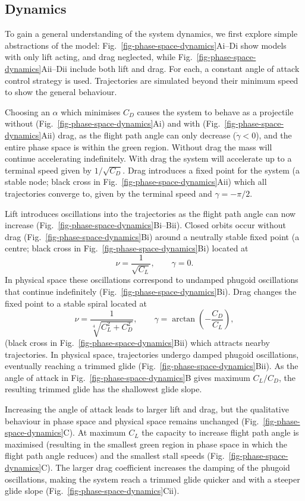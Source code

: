 \subsection{Dynamics} \label{sec-results-dynamics}

To gain a general understanding of the system dynamics, we first explore simple abstractions of the model: Fig.~\ref{fig-phase-space-dynamics}Ai--Di show models with only lift acting, and drag neglected, while Fig.~\ref{fig-phase-space-dynamics}Aii--Dii include both lift and drag. For each, a constant angle of attack control strategy is used. Trajectories are simulated beyond their minimum speed to show the general behaviour.

Choosing an $\alpha$ which minimises $C_D$ causes the system to behave as a projectile without (Fig.~\ref{fig-phase-space-dynamics}Ai) and with (Fig.~\ref{fig-phase-space-dynamics}Aii) drag, as the flight path angle can only decrease ($\dot{\gamma}<0$), and the entire phase space is within the green region. Without drag the mass will continue accelerating indefinitely. With drag the system will accelerate up to a terminal speed given by $1/\sqrt{C_D}$. Drag introduces a fixed point for the system (a stable node; black cross in Fig.~\ref{fig-phase-space-dynamics}Aii) which all trajectories converge to, given by the terminal speed and $\gamma=-\pi/2$.

Lift introduces oscillations into the trajectories as the flight path angle can now increase (Fig.~\ref{fig-phase-space-dynamics}Bi--Bii). Closed orbits occur without drag (Fig.~\ref{fig-phase-space-dynamics}Bi) around a neutrally stable fixed point (a centre; black cross in Fig.~\ref{fig-phase-space-dynamics}Bi) located at
\[
    \nu=\frac{1}{\sqrt{C_L}}, \qquad \gamma = 0 .
\]
In physical space these oscillations correspond to undamped phugoid oscillations that continue indefinitely (Fig.~\ref{fig-phase-space-dynamics}Bi). Drag changes the fixed point to a stable spiral located at
\[
    \nu=\frac{1}{\sqrt[4]{C_L^2+C_D^2}}, \qquad
    \gamma=\arctan\!\left(-\frac{C_D}{C_L}\right),
\]
(black cross in Fig.~\ref{fig-phase-space-dynamics}Bii) which attracts nearby trajectories. In physical space, trajectories undergo damped phugoid oscillations, eventually reaching a trimmed glide (Fig.~\ref{fig-phase-space-dynamics}Bii). As the angle of attack in Fig.~\ref{fig-phase-space-dynamics}B gives maximum $C_L/C_D$, the resulting trimmed glide has the shallowest glide slope.

Increasing the angle of attack leads to larger lift and drag, but the qualitative behaviour in phase space and physical space remains unchanged (Fig.~\ref{fig-phase-space-dynamics}C). At maximum $C_L$ the capacity to increase flight path angle is maximised (resulting in the smallest green region in phase space in which the flight path angle reduces) and the smallest stall speeds (Fig.~\ref{fig-phase-space-dynamics}C). The larger drag coefficient increases the damping of the phugoid oscillations, making the system reach a trimmed glide quicker and with a steeper glide slope (Fig.~\ref{fig-phase-space-dynamics}Cii).


